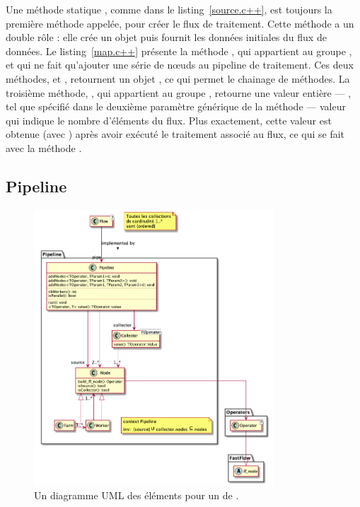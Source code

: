 Une m\'ethode statique , comme dans le listing~\ref{source.c++}, est toujours la premi\`ere m\'ethode appelée, pour créer le flux de traitement. Cette m\'ethode a un double r\^ole : elle cr\'ee un objet  puis fournit les donn\'ees initiales du flux de donn\'ees. Le listing~\ref{map.c++} pr\'esente la m\'ethode , qui appartient au groupe , et qui ne fait qu'ajouter une série de n\oe{}uds au pipeline de traitement. Ces deux m\'ethodes,  et , retournent un objet , ce qui permet le chainage de méthodes. La troisi\`eme m\'ethode, , qui appartient au groupe , retourne une valeur enti\`ere
---
, tel que sp\'ecifi\'e dans le deuxi\`eme param\`etre générique de la m\'ethode 
---
valeur qui indique le nombre d'\'el\'ements du flux. Plus exactement, cette valeur est obtenue (avec ) après avoir ex\'ecuté le traitement associé au flux, ce qui se fait avec la m\'ethode .

\subsection{Pipeline}

\begin{figure}
\centering
         \includegraphics[width=0.8\textwidth]{Figures/pipeline.png}
      \caption{Un diagramme UML des éléments pour un  de \ppff.}
       \label{pipeline.fig}
\end{figure}

